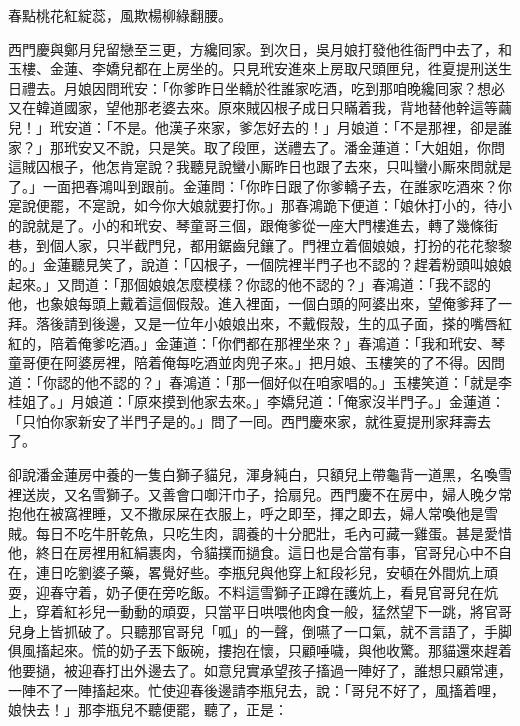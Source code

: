 \begin{myquote} 
春點桃花紅綻蕊，風欺楊柳綠翻腰。
\end{myquote} 

西門慶與鄭月兒留戀至三更，方纔囘家。到次日，吳月娘打發他徃衙門中去了，和玉樓、金蓮、李嬌兒都在上房坐的。只見玳安進來上房取尺頭匣兒，徃夏提刑送生日禮去。月娘因問玳安：「你爹昨日坐轎於徃誰家吃酒，吃到那咱晚纔囘家？想必又在韓道國家，望他那老婆去來。原來賊囚根子成日只瞞着我，背地替他幹這等繭兒！」{}玳安道：「不是。他漢子來家，爹怎好去的！」月娘道：「不是那裡，卻是誰家？」那玳安又不說，只是笑。取了段匣，送禮去了。潘金蓮道：「大姐姐，你問這賊囚根子，他怎肯寔說？我聽見說蠻小厮昨日也跟了去來，只叫蠻小厮來問就是了。」一面把春鴻叫到跟前。金蓮問：「你昨日跟了你爹轎子去，在誰家吃酒來？你寔說便罷，不寔說，如今你大娘就要打你。」那春鴻跪下便道：「娘休打小的，待小的說就是了。小的和玳安、琴童哥三個，跟俺爹從一座大門樓進去，轉了幾條街巷，到個人家，只半截門兒，都用鋸齒兒鑲了。門裡立着個娘娘，打扮的花花黎黎的。」金蓮聽見笑了，說道：「囚根子，一個院裡半門子也不認的？趕着粉頭叫娘娘起來。」又問道：「那個娘娘怎麼模樣？你認的他不認的？」春鴻道：「我不認的他，也象娘每頭上戴着這個假殼。進入裡面，一個白頭的阿婆出來，望俺爹拜了一拜。落後請到後邊，又是一位年小娘娘出來，不戴假殼，生的瓜子面，搽的嘴唇紅紅的，陪着俺爹吃酒。」金蓮道：「你們都在那裡坐來？」春鴻道：「我和玳安、琴童哥便在阿婆房裡，陪着俺每吃酒並肉兜子來。」把月娘、玉樓笑的了不得。因問道：「你認的他不認的？」春鴻道：「那一個好似在咱家唱的。」{}玉樓笑道：「就是李桂姐了。」月娘道：「原來摸到他家去來。」{}李嬌兒道：「俺家沒半門子。」金蓮道：「只怕你家新安了半門子是的。」問了一囘。西門慶來家，就徃夏提刑家拜壽去了。

卻說潘金蓮房中養的一隻白獅子貓兒，渾身純白，只額兒上帶龜背一道黑，名喚雪裡送炭，又名雪獅子。又善會口啣汗巾子，拾扇兒。西門慶不在房中，婦人晚夕常抱他在被窩裡睡，又不撒尿屎在衣服上，呼之即至，揮之即去，婦人常喚他是雪賊。每日不吃牛肝乾魚，只吃生肉，調養的十分肥壯，毛內可藏一雞蛋。甚是愛惜他，終日在房裡用紅絹裹肉，令貓撲而撾食。這日也是合當有事，官哥兒心中不自在，連日吃劉婆子藥，畧覺好些。李瓶兒與他穿上紅段衫兒，安頓在外間炕上頑耍，迎春守着，奶子便在旁吃飯。不料這雪獅子正蹲在護炕上，看見官哥兒在炕上，穿着紅衫兒一動動的頑耍，只當平日哄喂他肉食一般，猛然望下一跳，將官哥兒身上皆抓破了。只聽那官哥兒「呱」的一聲，倒嚥了一口氣，就不言語了，手脚俱風搐起來。慌的奶子丟下飯碗，摟抱在懷，只顧唾噦，與他收驚。那貓還來趕着他要撾，被迎春打出外邊去了。如意兒實承望孩子搐過一陣好了，誰想只顧常連，一陣不了一陣搐起來。忙使迎春後邊請李瓶兒去，說：「哥兒不好了，風搐着哩，娘快去！」那李瓶兒不聽便罷，聽了，正是：

